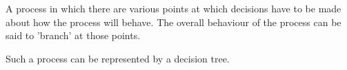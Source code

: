 A process in which there are various points at which decisions have
to be made about how the process will behave. The overall behaviour
of the process can be said to 'branch' at those points.
\par
Such a process can be represented by a decision tree.